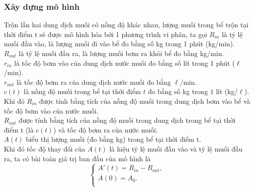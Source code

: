 \subsubsection{Xây dựng mô hình}
Trộn lẫn hai dung dịch muối có nồng độ khác nhau, lượng muối trong bể trộn tại thời điểm t sẽ được mô hình hóa bởi 1 phương trình vi phân, ta gọi 
${{R}_{in}}$ là tỷ lệ muối đầu vào, là lượng muối đi vào bể đo bằng số kg trong 1 phút (kg/min).\\
${{R}_{out}}$ là tỷ lệ muối đầu ra, là lượng muối bơm ra khỏi bể đo bằng kg/min.\\
${{r}_{in}}$ là tốc độ bơm vào của dung dịch nước muối đo bằng số lít trong 1 phút ($\ell$/min).\\
${{r}_{out}}$ là tốc độ bơm ra của dung dịch nước muối đo bằng $\ell$/min.\\
$c(t)$ là nồng độ muối trong bể tại thời điểm $t$ đo bằng số kg trong $1$ lít (kg/$\ell$).\\
Khi đó ${{R}_{in}}$ được tính bằng tích của nồng độ muối trong dung dịch bơm vào bể và tốc độ bơm vào của nước muối.\\
${{R}_{out}}$ được tính bằng tích của nồng độ muối trong dung dịch trong bể tại thời điểm t (là $c(t)$) và tốc độ bơm ra của nước muối.\\
$A(t)$ biểu thị lượng muối (đo bằng kg) trong bể tại thời điểm t.\\
 Khi đó tốc độ thay đổi của $A(t)$ là hiệu tỷ lệ muối đầu vào và tỷ lệ muối đầu ra, ta có bài toán giá trị ban đầu của mô hình là 
\begin{equation}
	 \left\{ \begin{array}{l}
 	 {A}'(t)={{R}_{in}}-{{R}_{out}}, \\ 
 	 A(0)={{A}_{0}}. \\ 
 \end{array} \right.
\label{eq:2.6}
\end{equation}
